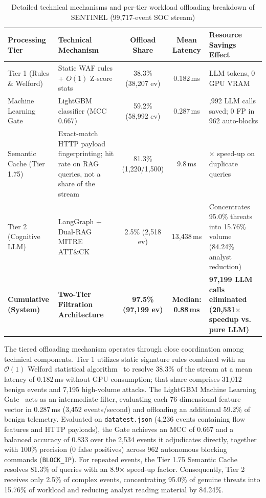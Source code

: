 \begin{table}[htbp]
\centering
\caption[Per-tier workload offloading and latency breakdown]{Detailed technical mechanisms and per-tier workload offloading breakdown of SENTINEL (99,717-event SOC stream)}
\label{tab:tier1_performance}
\footnotesize
\setlength{\tabcolsep}{4pt}
\begin{tabularx}{\textwidth}{>{\raggedright\arraybackslash}p{2.6cm} >{\raggedright\arraybackslash}X c c >{\raggedright\arraybackslash}p{3.2cm}}
\toprule
\textbf{Processing Tier} & \textbf{Technical Mechanism} & \textbf{Offload Share} & \textbf{Mean Latency} & \textbf{Resource Savings Effect} \\
\midrule
Tier 1 (Rules \& Welford) & Static WAF rules + $O(1)$ Z-score stats & 38.3\% (38,207 ev) & 0.182\,ms & 0 LLM tokens, 0 GPU VRAM \\
Machine Learning Gate & LightGBM classifier (MCC 0.667) & 59.2\% (58,992 ev) & 0.287\,ms & 58,992 LLM calls saved; 0 FP in 962 auto-blocks \\
Semantic Cache (Tier 1.75) & Exact-match HTTP payload fingerprinting; hit rate on RAG queries, not a share of the stream & 81.3\% (1,220/1,500) & 9.8\,ms & 8.9$\times$ speed-up on duplicate queries \\
Tier 2 (Cognitive LLM) & LangGraph + Dual-RAG MITRE ATT\&CK & 2.5\% (2,518 ev) & 13,438\,ms & Concentrates 95.0\% threats into 15.76\% volume (84.24\% analyst reduction) \\
\midrule
\textbf{Cumulative (System)} & \textbf{Two-Tier Filtration Architecture} & \textbf{97.5\% (97,199 ev)} & \textbf{Median: 0.88\,ms} & \textbf{97,199 LLM calls eliminated (20,531$\times$ speedup vs. pure LLM)} \\
\bottomrule
\end{tabularx}
\end{table}

The tiered offloading mechanism operates through close coordination among technical components. Tier 1 utilizes static signature rules combined with an $\mathcal{O}(1)$ Welford statistical algorithm~\cite{welford1962} to resolve 38.3\% of the stream at a mean latency of 0.182\,ms without GPU consumption; that share comprises 31,012 benign events and 7,195 high-volume attacks. The LightGBM Machine Learning Gate~\cite{ke2017lightgbm} acts as an intermediate filter, evaluating each 76-dimensional feature vector in 0.287\,ms (3,452 events/second) and offloading an additional 59.2\% of benign telemetry. Evaluated on \texttt{datatest.json} (4,236 events containing flow features and HTTP payloads), the Gate achieves an MCC of 0.667 and a balanced accuracy of 0.833 over the 2,534 events it adjudicates directly, together with 100\% precision (0 false positives) across 962 autonomous blocking commands (\texttt{BLOCK\_IP}). For repeated events, the Tier 1.75 Semantic Cache resolves 81.3\% of queries with an 8.9$\times$ speed-up factor. Consequently, Tier 2 receives only 2.5\% of complex events, concentrating 95.0\% of genuine threats into 15.76\% of workload and reducing analyst reading material by 84.24\%.

